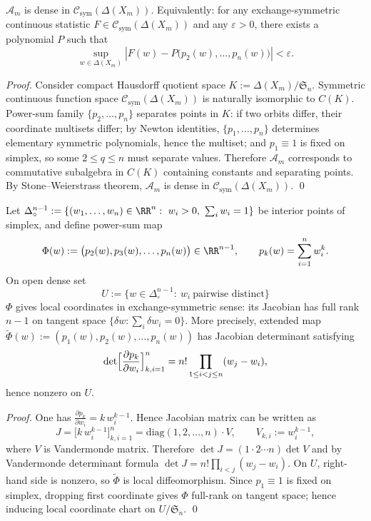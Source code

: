 \begin{theorem}\label{thm:pom-mom-symmetric-observables-stone-weierstrass}
\(\mathcal{A}_m\) is dense in \(\mathcal{C}_{\mathrm{sym}}(\Delta(X_m))\).
Equivalently: for any exchange-symmetric continuous statistic \(F\in \mathcal{C}_{\mathrm{sym}}(\Delta(X_m))\) and any \(\varepsilon>0\), there exists a polynomial \(P\) such that
\[
\sup_{w\in\Delta(X_m)}\left|F(w)-P\bigl(p_2(w),\dots,p_{n}(w)\bigr)\right|<\varepsilon.
\]
\end{theorem}
\begin{proof}
Consider compact Hausdorff quotient space \(K:=\Delta(X_m)/\mathfrak{S}_{n}\).
Symmetric continuous function space \(\mathcal{C}_{\mathrm{sym}}(\Delta(X_m))\) is naturally isomorphic to \(C(K)\).
Power-sum family \(\{p_2,\dots,p_n\}\) separates points in \(K\): if two orbits differ, their coordinate multisets differ;
by Newton identities, \(\{p_1,\dots,p_n\}\) determines elementary symmetric polynomials, hence the multiset; and \(p_1\equiv 1\) is fixed on simplex, so some \(2\le q\le n\) must separate values.
Therefore \(\mathcal{A}_m\) corresponds to commutative subalgebra in \(C(K)\) containing constants and separating points.
By Stone--Weierstrass theorem, \(\mathcal{A}_m\) is dense in \(\mathcal{C}_{\mathrm{sym}}(\Delta(X_m))\). \qed
\end{proof}

\begin{theorem}\label{thm:pom-power-sum-vandermonde-jacobian}
Let \(\Delta^{n-1}_{\circ}:=\{(w_1,\dots,w_n)\in\RR^n:\ w_i>0,\ \sum_i w_i=1\}\) be interior points of simplex, and define power-sum map
\[
\Phi(w):=\bigl(p_2(w),p_3(w),\dots,p_n(w)\bigr)\in\RR^{n-1},
\qquad
p_k(w)=\sum_{i=1}^n w_i^k.
\]
On open dense set
\[
U:=\{w\in\Delta^{n-1}_{\circ}:\ w_i\ \text{pairwise distinct}\}
\]
\(\Phi\) gives local coordinates in exchange-symmetric sense: its Jacobian has full rank \(n-1\) on tangent space \(\{\delta w:\sum_i\delta w_i=0\}\).
More precisely, extended map
\(
\widetilde\Phi(w):=(p_1(w),p_2(w),\dots,p_n(w))
\)
has Jacobian determinant satisfying
\[
\det\Bigl[\frac{\partial p_k}{\partial w_i}\Bigr]_{k,i=1}^{n}
=
n!\prod_{1\le i<j\le n}(w_j-w_i),
\]
hence nonzero on \(U\).
\end{theorem}
\begin{proof}
One has \(\frac{\partial p_k}{\partial w_i}=k\,w_i^{k-1}\).
Hence Jacobian matrix can be written as
\[
J=\bigl[k\,w_i^{k-1}\bigr]_{k,i=1}^{n}
=\mathrm{diag}(1,2,\dots,n)\cdot V,
\qquad
V_{k,i}:=w_i^{k-1},
\]
where \(V\) is Vandermonde matrix.
Therefore
\(
\det J=(1\cdot2\cdots n)\det V
\)
and by Vandermonde determinant formula
\(
\det J=n!\prod_{i<j}(w_j-w_i)
\).
On \(U\), right-hand side is nonzero, so \(\widetilde\Phi\) is local diffeomorphism.
Since \(p_1\equiv 1\) is fixed on simplex, dropping first coordinate gives \(\Phi\) full-rank on tangent space; hence inducing local coordinate chart on \(U/\mathfrak{S}_n\). \qed
\end{proof}

